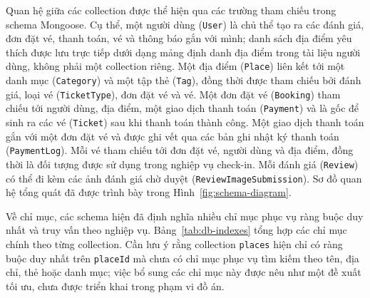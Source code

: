 ﻿\documentclass[../DoAn.tex]{subfiles}
\begin{document}
Quan hệ giữa các collection được thể hiện qua các trường tham chiếu trong schema Mongoose. Cụ thể, một người dùng (\texttt{User}) là chủ thể tạo ra các đánh giá, đơn đặt vé, thanh toán, vé và thông báo gắn với mình; danh sách địa điểm yêu thích được lưu trực tiếp dưới dạng mảng định danh địa điểm trong tài liệu người dùng, không phải một collection riêng. Một địa điểm (\texttt{Place}) liên kết tới một danh mục (\texttt{Category}) và một tập thẻ (\texttt{Tag}), đồng thời được tham chiếu bởi đánh giá, loại vé (\texttt{TicketType}), đơn đặt vé và vé. Một đơn đặt vé (\texttt{Booking}) tham chiếu tới người dùng, địa điểm, một giao dịch thanh toán (\texttt{Payment}) và là gốc để sinh ra các vé (\texttt{Ticket}) sau khi thanh toán thành công. Một giao dịch thanh toán gắn với một đơn đặt vé và được ghi vết qua các bản ghi nhật ký thanh toán (\texttt{PaymentLog}). Mỗi vé tham chiếu tới đơn đặt vé, người dùng và địa điểm, đồng thời là đối tượng được sử dụng trong nghiệp vụ check-in. Mỗi đánh giá (\texttt{Review}) có thể đi kèm các ảnh đánh giá chờ duyệt (\texttt{ReviewImageSubmission}). Sơ đồ quan hệ tổng quát đã được trình bày trong Hình~\ref{fig:schema-diagram}.

Về chỉ mục, các schema hiện đã định nghĩa nhiều chỉ mục phục vụ ràng buộc duy nhất và truy vấn theo nghiệp vụ. Bảng~\ref{tab:db-indexes} tổng hợp các chỉ mục chính theo từng collection. Cần lưu ý rằng collection \texttt{places} hiện chỉ có ràng buộc duy nhất trên \texttt{placeId} mà chưa có chỉ mục phục vụ tìm kiếm theo tên, địa chỉ, thẻ hoặc danh mục; việc bổ sung các chỉ mục này được nêu như một đề xuất tối ưu, chưa được triển khai trong phạm vi đồ án.
\end{document}
